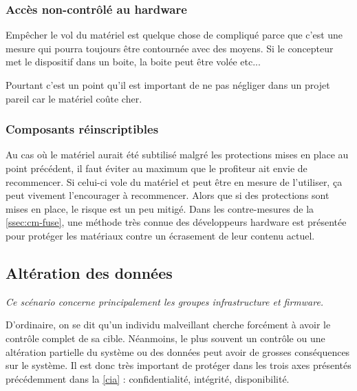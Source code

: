 \documentclass[12pt]{article}
\begin{document}
\subsubsection{Accès non-contrôlé au hardware}

Empêcher le vol du matériel est quelque chose de compliqué parce que c'est une mesure qui pourra toujours être contournée avec des moyens. Si le concepteur met le dispositif dans un boite, la boite peut être volée etc...

Pourtant c'est un point qu'il est important de ne pas négliger dans un projet pareil car le matériel coûte cher.

\subsubsection{Composants réinscriptibles}

Au cas où le matériel aurait été subtilisé malgré les protections mises en place au point précédent, il faut éviter au maximum que le profiteur ait envie de recommencer. Si celui-ci vole du matériel et peut être en mesure de l'utiliser, ça peut vivement l'encourager à recommencer. Alors que si des protections sont mises en place, le risque est un peu mitigé. Dans les contre-mesures de la \autoref{ssec:cm-fuse}, une méthode très connue des développeurs hardware est présentée pour protéger les matériaux contre un écrasement de leur contenu actuel.
\clearpage


\subsection{Altération des données}

\emph{Ce scénario concerne principalement les groupes infrastructure et firmware.}
\medskip

D'ordinaire, on se dit qu'un individu malveillant cherche forcément à avoir le contrôle complet de sa cible. Néanmoins, le plus souvent un contrôle ou une altération partielle du système ou des données peut avoir de grosses conséquences sur le système. Il est donc très important de protéger dans les trois axes présentés précédemment dans la \autoref{cia} : confidentialité, intégrité, disponibilité.
\medskip
\end{document}
